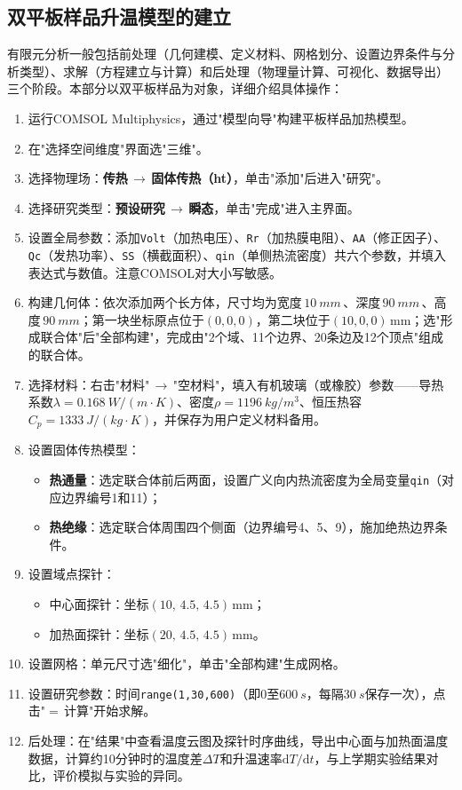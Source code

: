 \documentclass[a4paper,8pt,twocolumn]{article}
\begin{document}
\subsection{双平板样品升温模型的建立}

有限元分析一般包括前处理（几何建模、定义材料、网格划分、设置边界条件与分析类型）、求解（方程建立与计算）和后处理（物理量计算、可视化、数据导出）三个阶段。本部分以双平板样品为对象，详细介绍具体操作：

\begin{enumerate}[label=(\arabic*)]
  \item 运行COMSOL Multiphysics，通过"模型向导"构建平板样品加热模型。
  \item 在"选择空间维度"界面选"三维"。
  \item 选择物理场：\textbf{传热\,$\to$\,固体传热（ht）}，单击"添加"后进入"研究"。
  \item 选择研究类型：\textbf{预设研究\,$\to$\,瞬态}，单击"完成"进入主界面。
  \item 设置全局参数：添加\texttt{Volt}（加热电压）、\texttt{Rr}（加热膜电阻）、\texttt{AA}（修正因子）、\texttt{Qc}（发热功率）、\texttt{SS}（横截面积）、\texttt{qin}（单侧热流密度）共六个参数，并填入表达式与数值。注意COMSOL对大小写敏感。
  \item 构建几何体：依次添加两个长方体，尺寸均为宽度\,$\SI{10}{mm}$\,、深度\,$\SI{90}{mm}$\,、高度\,$\SI{90}{mm}$；第一块坐标原点位于$(0,0,0)$，第二块位于$(10,0,0)$\,mm；选"形成联合体"后"全部构建"，完成由"2个域、11个边界、20条边及12个顶点"组成的联合体。
  \item 选择材料：右击"材料"\,$\to$\,"空材料"，填入有机玻璃（或橡胶）参数——导热系数$\lambda=\SI{0.168}{W/(m\cdot K)}$、密度$\rho=\SI{1196}{kg/m^3}$、恒压热容$C_p=\SI{1333}{J/(kg\cdot K)}$，并保存为用户定义材料备用。
  \item 设置固体传热模型：
    \begin{itemize}
      \item \textbf{热通量}：选定联合体前后两面，设置广义向内热流密度为全局变量\texttt{qin}（对应边界编号1和11）；
      \item \textbf{热绝缘}：选定联合体周围四个侧面（边界编号4、5、9），施加绝热边界条件。
    \end{itemize}
  \item 设置域点探针：
    \begin{itemize}
      \item 中心面探针：坐标$(10,\,4.5,\,4.5)$\,mm；
      \item 加热面探针：坐标$(20,\,4.5,\,4.5)$\,mm。
    \end{itemize}
  \item 设置网格：单元尺寸选"细化"，单击"全部构建"生成网格。
  \item 设置研究参数：时间\texttt{range(1,30,600)}（即$0$至$\SI{600}{s}$，每隔$\SI{30}{s}$保存一次），点击"$=$\,计算"开始求解。
  \item 后处理：在"结果"中查看温度云图及探针时序曲线，导出中心面与加热面温度数据，计算约10分钟时的温度差$\Delta T$和升温速率$\mathrm{d}T/\mathrm{d}t$，与上学期实验结果对比，评价模拟与实验的异同。
\end{enumerate}
\end{document}
